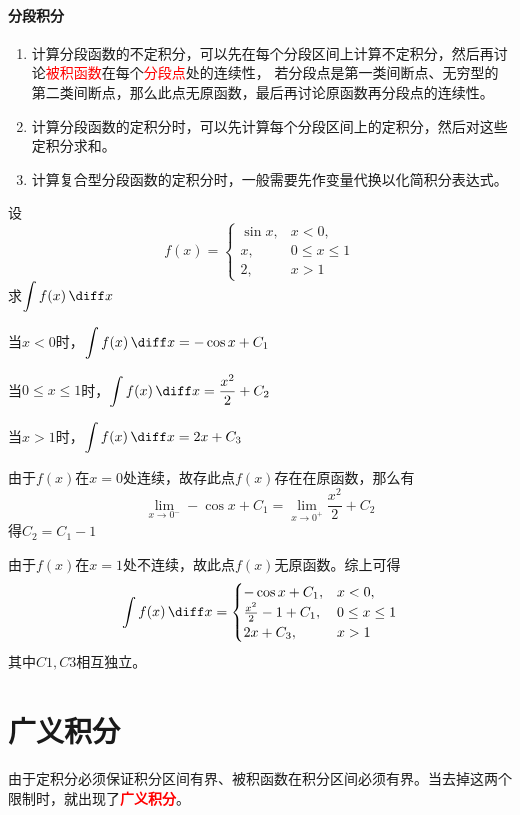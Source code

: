 \paragraph{分段积分}
\begin{enumerate}[(1)]
    \item 计算分段函数的不定积分，可以先在每个分段区间上计算不定积分，然后再讨论\textcolor{red}{被积函数}在每个\textcolor{red}{分段点}处的连续性，
          若分段点是第一类间断点、无穷型的第二类间断点，那么此点无原函数，最后再讨论原函数再分段点的连续性。
    \item 计算分段函数的定积分时，可以先计算每个分段区间上的定积分，然后对这些定积分求和。
    \item 计算复合型分段函数的定积分时，一般需要先作变量代换以化简积分表达式。
\end{enumerate}
\begin{example}
    设
    \[
        f(x) =
        \begin{cases}
            \sin x, & x<0,           \\
            x,      & 0\leq x \leq 1 \\
            2,      & x>1
        \end{cases}
    \]
    求$\displaystyle\int f(x)\,\diff x$
\end{example}
\begin{solution}
    当$x<0$时，$\displaystyle\int f(x)\,\diff x = -\cos x + C_1$

    当$0\leq x \leq 1$时，$\displaystyle\int f(x)\,\diff x = \frac{x^2}{2} + C_2$

    当$x>1$时，$\displaystyle\int f(x)\,\diff x = 2x + C_3$

    由于$f(x)$在$x=0$处连续，故存此点$f(x)$存在在原函数，那么有
    \[ \lim_{x\to 0^-} -\cos x + C_1 = \lim_{x\to 0^+} \frac{x^2}{2} + C_2 \]
    得$C_2=C_1 - 1$

    由于$f(x)$在$x=1$处不连续，故此点$f(x)$无原函数。综上可得
    \[
        \int f(x)\,\diff x =
        \begin{cases}
            -\cos x + C_1,            & x<0,           \\
            \frac{x^2}{2}  - 1 + C_1, & 0\leq x \leq 1 \\
            2x + C_3,                 & x>1
        \end{cases}
    \]
    其中$C1,C3$相互独立。
\end{solution}

\section{广义积分}
由于定积分必须保证积分区间有界、被积函数在积分区间必须有界。当去掉这两个限制时，就出现了\textcolor{red}{\textsf{\textbf{广义积分}}}。
